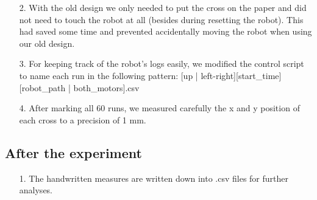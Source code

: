 \begin{itemize}
\begin{itemize}
            \item[2.] With the old design we only needed to put the cross on the paper and did not need to touch the robot at all (besides during resetting the robot). This had saved some time and prevented  accidentally moving the robot when using our old design.
            
            \item[3.] For keeping track of the robot's logs easily, we modified the control script to name each run in the following pattern: [up | left-right][start\_time][robot\_path | both\_motors].csv
            
            \item[4.] After marking all 60 runs, we measured carefully the x and y position of each cross to a precision of 1 mm.
        \end{itemize}
        
        \subsection{After the experiment}
        \begin{itemize}
            \item[1.] The handwritten measures are written down into .csv files for further analyses. 
        \end{itemize}
        \end{itemize}
        
        
                
